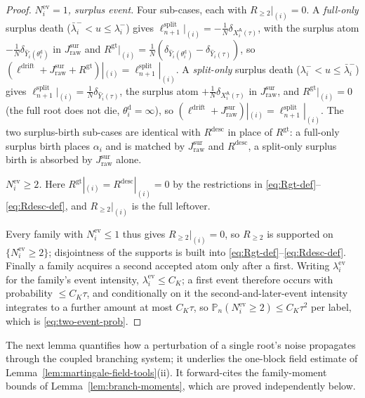 \documentclass[a4paper,fleqn]{cas-sc}
\theoremstyle{definition}
\theoremstyle{remark}
\begin{document}
\begin{proof}
\emph{$N^{\mathrm{ev}}_i=1$, surplus event.} Four sub-cases, each with $R_{\ge2}|_{(i)}=0$.
A \emph{full-only} surplus death ($\bar\lambda^-_i<u\le\lambda^-_i$) gives
$\ell^{\mathrm{split}}_{n+1}|_{(i)}=-\frac1N\delta_{X^{\mathsf A}_i(\tau)}$, with the surplus
atom $-\frac1N\delta_{\widehat Y_i(\theta^{\mathrm d}_i)}$ in $J^{\mathrm{sur}}_{\mathrm{raw}}$
and $R^{\mathrm{gt}}|_{(i)}=\frac1N(\delta_{\widehat Y_i(\theta^{\mathrm d}_i)}-\delta_{\widehat Y_i(\tau)})$,
so $(\ell^{\mathrm{drift}}+J^{\mathrm{sur}}_{\mathrm{raw}}+R^{\mathrm{gt}})|_{(i)}=\ell^{\mathrm{split}}_{n+1}|_{(i)}$.
A \emph{split-only} surplus death ($\lambda^-_i<u\le\bar\lambda^-_i$) gives
$\ell^{\mathrm{split}}_{n+1}|_{(i)}=\frac1N\delta_{\widehat Y_i(\tau)}$, the surplus atom
$+\frac1N\delta_{X^{\mathsf A}_i(\tau)}$ in $J^{\mathrm{sur}}_{\mathrm{raw}}$, and
$R^{\mathrm{gt}}|_{(i)}=0$ (the full root does not die, $\theta^{\mathrm d}_i=\infty$), so
$(\ell^{\mathrm{drift}}+J^{\mathrm{sur}}_{\mathrm{raw}})|_{(i)}=\ell^{\mathrm{split}}_{n+1}|_{(i)}$.
The two surplus-birth sub-cases are identical with $R^{\mathrm{desc}}$ in place of
$R^{\mathrm{gt}}$: a full-only surplus birth places $\alpha_i$ and is matched by
$J^{\mathrm{sur}}_{\mathrm{raw}}$ and $R^{\mathrm{desc}}$, a split-only surplus birth is
absorbed by $J^{\mathrm{sur}}_{\mathrm{raw}}$ alone.

\emph{$N^{\mathrm{ev}}_i\ge2$.} Here $R^{\mathrm{gt}}|_{(i)}=R^{\mathrm{desc}}|_{(i)}=0$ by the
restrictions in \eqref{eq:Rgt-def}--\eqref{eq:Rdesc-def}, and $R_{\ge2}|_{(i)}$ is the full
leftover.

Every family with $N^{\mathrm{ev}}_i\le1$ thus gives $R_{\ge2}|_{(i)}=0$, so $R_{\ge2}$ is
supported on $\{N^{\mathrm{ev}}_i\ge2\}$; disjointness of the supports is built into
\eqref{eq:Rgt-def}--\eqref{eq:Rdesc-def}. Finally a family acquires a second accepted atom
only after a first. Writing $\lambda^{\mathrm{ev}}_i$ for the family's event intensity,
$\lambda^{\mathrm{ev}}_i\le C_K$; a first event therefore occurs with probability $\le C_K\tau$, and
conditionally on it the second-and-later-event intensity integrates to a further amount at most $C_K\tau$,
so $\mathbb P_n(N^{\mathrm{ev}}_i\ge2)\le C_K\tau^2$ per label, which is \eqref{eq:two-event-prob}.
\end{proof}

The next lemma quantifies how a perturbation of a single root's noise propagates through the
coupled branching system; it underlies the one-block field estimate of
Lemma~\ref{lem:martingale-field-tools}(ii). It forward-cites the family-moment bounds of
Lemma~\ref{lem:branch-moments}, which are proved independently below.
\end{document}
